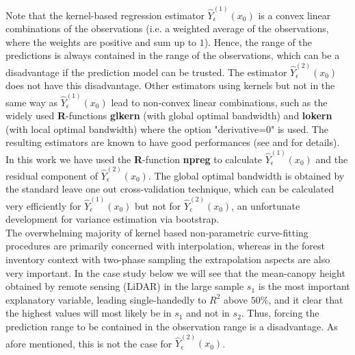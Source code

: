 \documentclass[a4paper,12pt,leqno, titlepage]{article}
\begin{document}
 Note that the kernel-based regression estimator $\hat{Y}^{(1)}_{\epsilon}(x_0)$ is a convex linear combinations of the observations (i.e. a weighted average of the observations,  where the weights are positive and sum up to $1$). Hence, the range of the predictions is always contained in the range of the observations, which can be a disadvantage if  the prediction model can be trusted. The estimator
 $\hat{Y}^{(2)}_{\epsilon}(x_0)$ does not have this disadvantage. Other estimators using kernels but not in the same way as $\hat{Y}^{(1)}_{\epsilon}(x_0)$ lead to non-convex linear combinations, such as the widely used \textbf{R}-functions \textbf{glkern} (with global optimal bandwidth) and \textbf{lokern} (with local optimal bandwidth) where the option "derivative=0" is used. The resulting estimators are known to have good performances (see \cite{gasser1} and \cite{gasser2} for details). In this work we have used the \textbf{R}-function \textbf{npreg} to calculate $\hat{Y}^{(1)}_{\epsilon}(x_0)$ and the residual component of $\hat{Y}^{(2)}_{\epsilon}(x_0)$. The global optimal bandwidth is obtained by the standard leave one out cross-validation technique, which can be calculated very efficiently for $\hat{Y}^{(1)}_{\epsilon}(x_0)$ but not for $\hat{Y}^{(2)}_{\epsilon}(x_0)$, an unfortunate development for variance estimation via bootstrap.\\
 The overwhelming majority of kernel based non-parametric curve-fitting procedures are primarily concerned with interpolation, whereas in the forest inventory context with two-phase sampling the extrapolation aspects are also very important. In the case study below we will see that the mean-canopy height obtained by remote sensing (LiDAR) in the large sample $s_1$ is the most important explanatory variable, leading single-handedly to $R^2$ above $50\%$, and it clear that the highest values will most likely be in $s_1$ and not in $s_2$. Thus, forcing the prediction range to be contained in the observation range is a disadvantage. As afore mentioned, this is not the case for $\hat{Y}^{(2)}_{\epsilon}(x_0)$.
\end{document}
